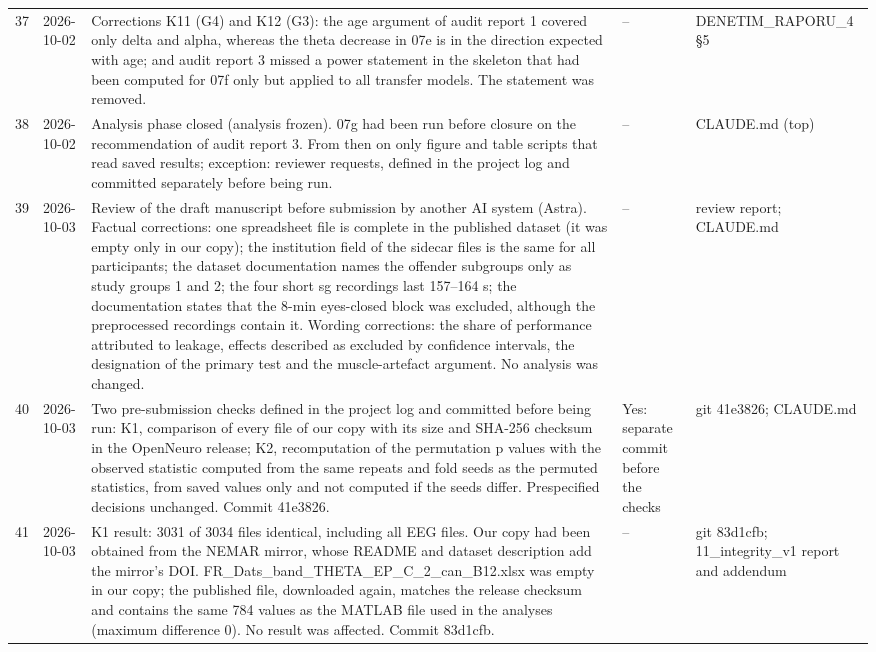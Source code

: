 \begin{longtable}{@{}p{0.6cm}p{1.9cm}p{6.8cm}p{2.8cm}p{2.3cm}@{}}
37 & \raggedright 2026-10-02 & Corrections K11 (G4) and K12 (G3): the age argument of audit report 1 covered only delta and alpha, whereas the theta decrease in 07e is in the direction expected with age; and audit report 3 missed a power statement in the skeleton that had been computed for 07f only but applied to all transfer models. The statement was removed. & \raggedright -- & \raggedright DENETIM\_\allowbreak{}RAPORU\_\allowbreak{}4 \S{}5 \tabularnewline
38 & \raggedright 2026-10-02 & Analysis phase closed (analysis frozen). 07g had been run before closure on the recommendation of audit report 3. From then on only figure and table scripts that read saved results; exception: reviewer requests, defined in the project log and committed separately before being run. & \raggedright -- & \raggedright CLAUDE.md (top) \tabularnewline
39 & \raggedright 2026-10-03 & Review of the draft manuscript before submission by another AI system (Astra). Factual corrections: one spreadsheet file is complete in the published dataset (it was empty only in our copy); the institution field of the sidecar files is the same for all participants; the dataset documentation names the offender subgroups only as study groups 1 and 2; the four short sg recordings last 157--164 s; the documentation states that the 8-min eyes-closed block was excluded, although the preprocessed recordings contain it. Wording corrections: the share of performance attributed to leakage, effects described as excluded by confidence intervals, the designation of the primary test and the muscle-artefact argument. No analysis was changed. & \raggedright -- & \raggedright review report; CLAUDE.md \tabularnewline
40 & \raggedright 2026-10-03 & Two pre-submission checks defined in the project log and committed before being run: K1, comparison of every file of our copy with its size and SHA-256 checksum in the OpenNeuro release; K2, recomputation of the permutation p values with the observed statistic computed from the same repeats and fold seeds as the permuted statistics, from saved values only and not computed if the seeds differ. Prespecified decisions unchanged. Commit 41e3826. & \raggedright Yes: separate commit before the checks & \raggedright git 41e3826; CLAUDE.md \tabularnewline
41 & \raggedright 2026-10-03 & K1 result: 3031 of 3034 files identical, including all EEG files. Our copy had been obtained from the NEMAR mirror, whose README and dataset description add the mirror's DOI. FR\_\allowbreak{}Dats\_\allowbreak{}band\_\allowbreak{}THETA\_\allowbreak{}EP\_\allowbreak{}C\_\allowbreak{}2\_\allowbreak{}can\_\allowbreak{}B12.xlsx was empty in our copy; the published file, downloaded again, matches the release checksum and contains the same 784 values as the MATLAB file used in the analyses (maximum difference 0). No result was affected. Commit 83d1cfb. & \raggedright -- & \raggedright git 83d1cfb; 11\_\allowbreak{}integrity\_\allowbreak{}v1 report and addendum \tabularnewline

\end{longtable}
